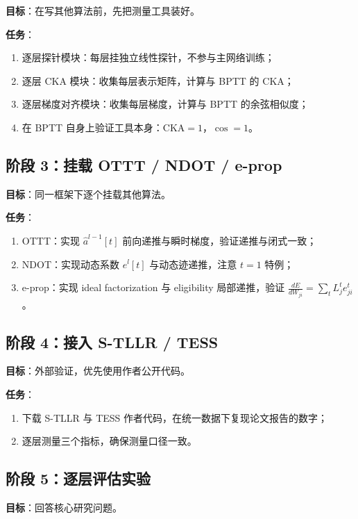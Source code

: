 \documentclass[journal,12pt,onecolumn]{IEEEtran}
\begin{document}
\textbf{目标}：在写其他算法前，先把测量工具装好。

\textbf{任务}：
\begin{enumerate}[leftmargin=1.5em,itemsep=0pt]
\item 逐层探针模块：每层挂独立线性探针，不参与主网络训练；
\item 逐层 CKA 模块：收集每层表示矩阵，计算与 BPTT 的 CKA；
\item 逐层梯度对齐模块：收集每层梯度，计算与 BPTT 的余弦相似度；
\item 在 BPTT 自身上验证工具本身：$\mathrm{CKA}=1$，$\cos=1$。
\end{enumerate}

\subsection{阶段 3：挂载 OTTT / NDOT / e-prop}

\textbf{目标}：同一框架下逐个挂载其他算法。

\textbf{任务}：
\begin{enumerate}[leftmargin=1.5em,itemsep=0pt]
\item OTTT：实现 $\hat{a}^{l-1}[t]$ 前向递推与瞬时梯度，验证递推与闭式一致；
\item NDOT：实现动态系数 $e^l[t]$ 与动态迹递推，注意 $t=1$ 特例；
\item e-prop：实现 ideal factorization 与 eligibility 局部递推，验证 $\frac{dE}{dW_{ji}}=\sum_t L_j^t e_{ji}^t$。
\end{enumerate}

\subsection{阶段 4：接入 S-TLLR / TESS}

\textbf{目标}：外部验证，优先使用作者公开代码。

\textbf{任务}：
\begin{enumerate}[leftmargin=1.5em,itemsep=0pt]
\item 下载 S-TLLR 与 TESS 作者代码，在统一数据下复现论文报告的数字；
\item 逐层测量三个指标，确保测量口径一致。
\end{enumerate}

\subsection{阶段 5：逐层评估实验}

\textbf{目标}：回答核心研究问题。
\end{document}
